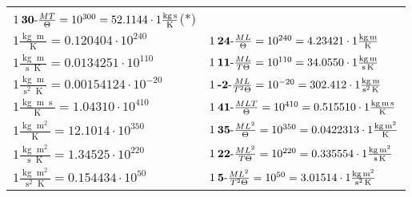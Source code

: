 \begin{center}
\begin{longtable}{l l}
	{\color{black}$1\:\text{\textbf{30}-} \frac{MT}{\Theta}=10^{300} = 52.1144 \cdot 1 \bm{\mathrm{ }}\frac{\operatorname{kg}\operatorname{s}}{\operatorname{K}}$}\quad(*)\\
{\color{black}$1 \bm{\mathrm{ }}\frac{\operatorname{kg}\operatorname{m}}{\operatorname{K}} = 0.120404\cdot10^{240} $}&
	{\color{black}$1\:\text{\textbf{24}-} \frac{ML}{\Theta}=10^{240} = 4.23421 \cdot 1 \bm{\mathrm{ }}\frac{\operatorname{kg}\operatorname{m}}{\operatorname{K}}$}\\
{\color{black}$1 \bm{\mathrm{ }}\frac{\operatorname{kg}\operatorname{m}}{\operatorname{s}\operatorname{K}} = 0.0134251\cdot10^{110} $}&
	{\color{black}$1\:\text{\textbf{11}-} \frac{ML}{T\Theta}=10^{110} = 34.0550 \cdot 1 \bm{\mathrm{ }}\frac{\operatorname{kg}\operatorname{m}}{\operatorname{s}\operatorname{K}}$}\\
{\color{black}$1 \bm{\mathrm{ }}\frac{\operatorname{kg}\operatorname{m}}{\operatorname{s}^2\operatorname{K}} = 0.00154124\cdot10^{-20} $}&
	{\color{black}$1\:\text{\textbf{-2}-} \frac{ML}{T^2\Theta}=10^{-20} = 302.412 \cdot 1 \bm{\mathrm{ }}\frac{\operatorname{kg}\operatorname{m}}{\operatorname{s}^2\operatorname{K}}$}\\
{\color{black}$1 \bm{\mathrm{ }}\frac{\operatorname{kg}\operatorname{m}\operatorname{s}}{\operatorname{K}} = 1.04310\cdot10^{410} $}&
	{\color{black}$1\:\text{\textbf{41}-} \frac{MLT}{\Theta}=10^{410} = 0.515510 \cdot 1 \bm{\mathrm{ }}\frac{\operatorname{kg}\operatorname{m}\operatorname{s}}{\operatorname{K}}$}\\
{\color{black}$1 \bm{\mathrm{ }}\frac{\operatorname{kg}\operatorname{m}^2}{\operatorname{K}} = 12.1014\cdot10^{350} $}&
	{\color{black}$1\:\text{\textbf{35}-} \frac{ML^2}{\Theta}=10^{350} = 0.0422313 \cdot 1 \bm{\mathrm{ }}\frac{\operatorname{kg}\operatorname{m}^2}{\operatorname{K}}$}\\
{\color{black}$1 \bm{\mathrm{ }}\frac{\operatorname{kg}\operatorname{m}^2}{\operatorname{s}\operatorname{K}} = 1.34525\cdot10^{220} $}&
	{\color{black}$1\:\text{\textbf{22}-} \frac{ML^2}{T\Theta}=10^{220} = 0.335554 \cdot 1 \bm{\mathrm{ }}\frac{\operatorname{kg}\operatorname{m}^2}{\operatorname{s}\operatorname{K}}$}\\
{\color{black}$1 \bm{\mathrm{ }}\frac{\operatorname{kg}\operatorname{m}^2}{\operatorname{s}^2\operatorname{K}} = 0.154434\cdot10^{50} $}&
	{\color{black}$1\:\text{\textbf{5}-} \frac{ML^2}{T^2\Theta}=10^{50} = 3.01514 \cdot 1 \bm{\mathrm{ }}\frac{\operatorname{kg}\operatorname{m}^2}{\operatorname{s}^2\operatorname{K}}$}\\

\end{longtable}
\end{center}
